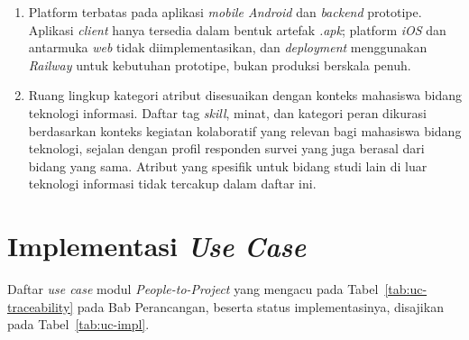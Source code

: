 \begin{enumerate}
  \item Platform terbatas pada aplikasi \emph{mobile Android} dan \emph{backend} prototipe. Aplikasi \emph{client} hanya tersedia dalam bentuk artefak \emph{.apk}; platform \emph{iOS} dan antarmuka \emph{web} tidak diimplementasikan, dan \emph{deployment} menggunakan \emph{Railway} untuk kebutuhan prototipe, bukan produksi berskala penuh.

  \item Ruang lingkup kategori atribut disesuaikan dengan konteks mahasiswa bidang teknologi informasi. Daftar tag \emph{skill}, minat, dan kategori peran dikurasi berdasarkan konteks kegiatan kolaboratif yang relevan bagi mahasiswa bidang teknologi, sejalan dengan profil responden survei yang juga berasal dari bidang yang sama. Atribut yang spesifik untuk bidang studi lain di luar teknologi informasi tidak tercakup dalam daftar ini.

\end{enumerate}

\section{Implementasi \emph{Use Case}}

Daftar \emph{use case} modul \emph{People-to-Project} yang mengacu pada Tabel~\ref{tab:uc-traceability} pada Bab Perancangan, beserta status implementasinya, disajikan pada Tabel~\ref{tab:uc-impl}.

